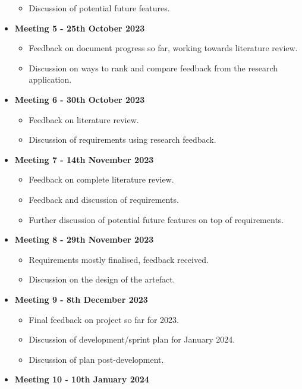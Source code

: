 \begin{itemize}
\begin{itemize}
        \item Discussion of potential future features.
    \end{itemize}
    \item \textbf{Meeting 5 - 25th October 2023}
    \begin{itemize}
        \item Feedback on document progress so far, working towards literature review.
        \item Discussion on ways to rank and compare feedback from the research application.
    \end{itemize}
    \item \textbf{Meeting 6 - 30th October 2023}
    \begin{itemize}
        \item Feedback on literature review.
        \item Discussion of requirements using research feedback.
    \end{itemize}
    \item \textbf{Meeting 7 - 14th November 2023}
    \begin{itemize}
        \item Feedback on complete literature review.
        \item Feedback and discussion of requirements.
        \item Further discussion of potential future features on top of requirements.
    \end{itemize}
    \item \textbf{Meeting 8 - 29th November 2023}
    \begin{itemize}
        \item Requirements mostly finalised, feedback received.
        \item Discussion on the design of the artefact.
    \end{itemize}
    \item \textbf{Meeting 9 - 8th December 2023}
    \begin{itemize}
        \item Final feedback on project so far for 2023.
        \item Discussion of development/sprint plan for January 2024.
        \item Discussion of plan post-development.
    \end{itemize}
    \item \textbf{Meeting 10 - 10th January 2024}
    \begin{itemize}

\end{itemize}
\end{itemize}
